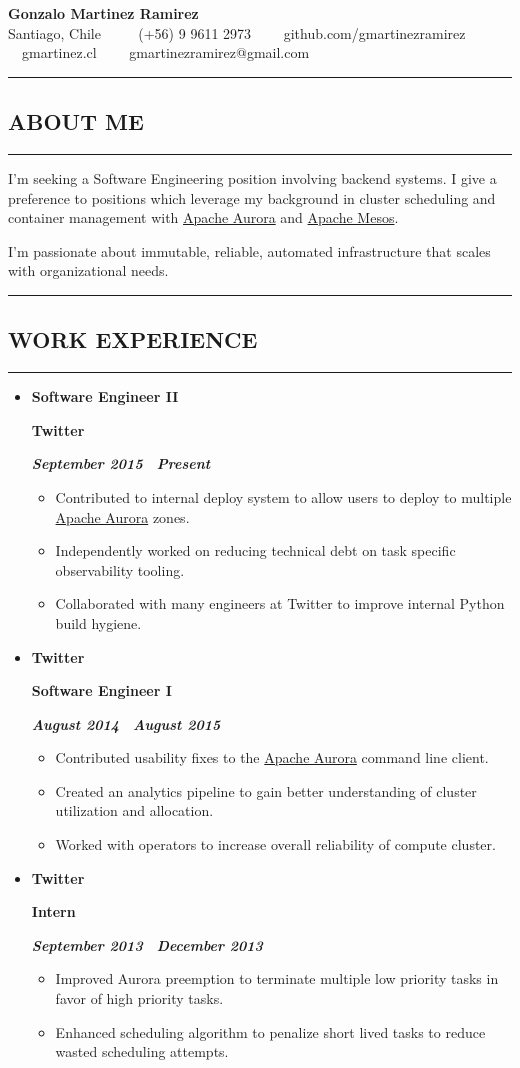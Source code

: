 \documentclass[10pt,letterpaper]{article}
\newcommand\textbox[1]{%
  \parbox{.333\textwidth}{#1}%
}
\newcommand{\titlePersonalInfo}[6]{
  \begin{center}{\huge \textbf{#1}}
  \\  #2 \ \ \textbullet
    \ \ #3\ \ \textbullet
    \ \ #4\ \ \textbullet
    \ \ #5\ \ \textbullet
    \ \ #6    
  \end{center}
}
\newcommand{\sectionTitle}[1]{
  \hrule
  \vspace{-1.0em} 
  \subsection*{\uppercase{\textbf{#1}}}
  \vspace{-0.3em}
    \hrule
    \vspace{0.5em}  
}
\newcommand{\titleExperienceWithoutLocation}[4]{
  \item[]
  {
    \textbox{\textbf{#1}\hfill}\textbox{\hfil \textbf{#2}\hfil}\hfill \textbf{\emph{#3 \textendash \ #4}}
  }
}
\begin{document}
    
  \titlePersonalInfo{Gonzalo Martinez Ramirez}{Santiago, Chile}{(+56) 9 9611 2973}{github.com/gmartinezramirez}{gmartinez.cl}{gmartinezramirez@gmail.com}
  
  \sectionTitle{About me}
  
  \noindent I'm seeking a Software Engineering position involving backend systems.
  I give a preference to positions which leverage my background in cluster
  scheduling and container management with \href{aurora.apache.org}{Apache Aurora}
  and \href{mesos.apache.org}{Apache Mesos}.
  
  \noindent I'm passionate about immutable, reliable, automated infrastructure
  that scales with organizational needs.
  \\
  
  \sectionTitle{Work Experience}
  \begin{itemize}[leftmargin=*]
    \parskip=-0.6em
    
    \titleExperienceWithoutLocation{Software Engineer II}{Twitter}{September 2015}{Present}
    \begin{itemize}[label=\textbullet]
      \itemsep0em
      \item Contributed to internal deploy system to allow users to deploy to
      multiple \href{aurora.apache.org}{Apache Aurora} zones.
      \item Independently worked on reducing technical debt on task specific
      observability tooling.
      \item Collaborated with many engineers at Twitter to improve internal
      Python build hygiene.
    \end{itemize}
    
    \titleExperienceWithoutLocation{Twitter}{Software Engineer I}{August 2014}{August 2015}
    \begin{itemize}[label=\textbullet]
      \itemsep0em
      \item Contributed usability fixes to the
      \href{aurora.apache.org}{Apache Aurora} command line client.
      \item Created an analytics pipeline to gain better understanding of
      cluster utilization and allocation.
      \item Worked with operators to increase overall reliability of compute
      cluster.
    \end{itemize}
    
    \titleExperienceWithoutLocation{Twitter}{Intern}{September 2013}{December 2013}
    \begin{itemize}[label=\textbullet]
      \itemsep0em
      \item Improved Aurora preemption to terminate multiple low priority tasks
      in favor of high priority tasks.
      \item Enhanced scheduling algorithm to penalize short lived tasks to
      reduce wasted scheduling attempts.
    \end{itemize}
    

\end{itemize}
\end{document}
